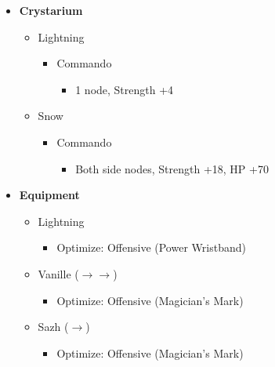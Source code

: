 \begin{paracol}{2}
\begin{menu}
\begin{itemize}
			\item \textbf{Crystarium}
			      \begin{itemize}
				      \item Lightning
				            \begin{itemize}
					            \item Commando
					                  \begin{itemize}
						                  \item 1 node, Strength +4
					                  \end{itemize}
				            \end{itemize}
				      \item Snow
				            \begin{itemize}
					            \item Commando
					                  \begin{itemize}
						                  \item Both side nodes, Strength +18, HP +70
					                  \end{itemize}
				            \end{itemize}
			      \end{itemize}

			\item \textbf{Equipment}
			      \begin{itemize}
				      \item Lightning
				            \begin{itemize}
					            \item Optimize: Offensive (Power Wristband)
				            \end{itemize}
				      \item Vanille ($\rightarrow \rightarrow$)
				            \begin{itemize}
					            \item Optimize: Offensive (Magician's Mark)
				            \end{itemize}
				      \item Sazh ($\rightarrow$)
				            \begin{itemize}
					            \item Optimize: Offensive (Magician's Mark)
				            \end{itemize}
			      \end{itemize}
		\end{itemize}
	\end{menu}
	\renewcommand{\first}{[1] Tri-Disaster (\rav/\rav/\rav)}


\end{paracol}
